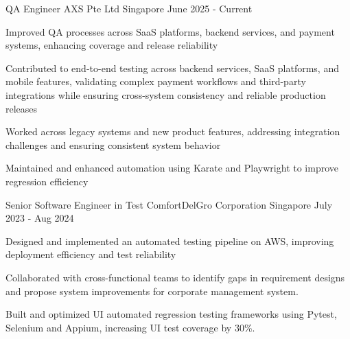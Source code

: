 
\begin{cventries}

  \cventry
    {QA Engineer} %
    {AXS Pte Ltd} %
    {Singapore} %
    {June 2025 - Current} %
    {
    \begin{cvitems}
      \item {Improved QA processes across SaaS platforms, backend services, and payment systems, enhancing coverage and release reliability}
      \item {Contributed to end-to-end testing across backend services, SaaS platforms, and mobile features, validating complex payment workflows and third-party integrations while ensuring cross-system consistency and reliable production releases}
      \item {Worked across legacy systems and new product features, addressing integration challenges and ensuring consistent system behavior}
      \item {Maintained and enhanced automation using Karate and Playwright to improve regression efficiency}
    \end{cvitems}
    }

  \cventry
    {Senior Software Engineer in Test} %
    {ComfortDelGro Corporation} %
    {Singapore} %
    {July 2023 - Aug 2024} %
    {
      \begin{cvitems} %
        \item {Designed and implemented an automated testing pipeline on AWS, improving deployment efficiency and test reliability}
        \item {Collaborated with cross-functional teams to identify gaps in requirement designs and propose system improvements for corporate management system.}
        \item {Built and optimized UI automated regression testing frameworks using Pytest, Selenium and Appium, increasing UI test coverage by 30\%.}
      \end{cvitems}
    }



\end{cventries}
